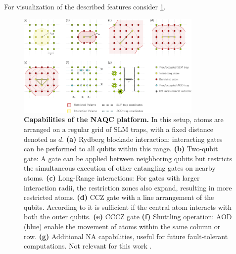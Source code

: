 For visualization of the described features consider \ref{fig:NeutralAtomFeatures}.

\begin{figure}[htbp]
  \centering
    \includegraphics[width=0.8\textwidth]{figures/NeutralAtomFeatures.pdf}
    \caption[Capabilities of the NAQC platform.]{\textbf{Capabilities of the NAQC platform.} In this setup, atoms are arranged on a regular grid of \ac{SLM} traps, with a fixed distance denoted as $d$.
  \textbf{(a)} Rydberg blockade interaction: interacting gates can be performed to all qubits within this range.
  \textbf{(b)} Two-qubit gate: A gate can be applied between neighboring qubits but restricts the simultaneous execution of other entangling gates on nearby atoms.
   \textbf{(c)} Long-Range interactions: For gates with larger interaction radii, the restriction zones also expand, resulting in more restricted atoms.
  \textbf{(d)} CCZ gate with a line arrangement of the qubits. 
  According to \cite{Levine_2019} it is sufficient if the central atom interacts with both the outer qubits.
  \textbf{(e)} CCCZ gate 
  \textbf{(f)} Shuttling operation: \ac{AOD} (blue) enable the movement of atoms within the same column or row.
  \textbf{(g)} Additional NA capabilities, useful for future fault-tolerant computations. Not relevant for this work
   \parencite{Schmid_2024_NeutralAtomBasics}.
}\label{fig:NeutralAtomFeatures}
\end{figure}
